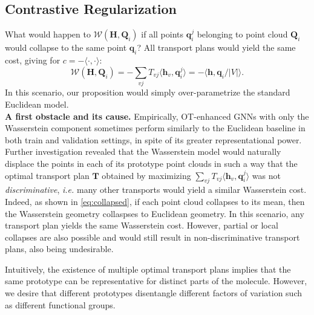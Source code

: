\documentclass[letterpaper]{article} \usepackage{aaai22}  \usepackage{times}  \usepackage{helvet}  \usepackage{courier}  \usepackage[hyphens]{url}  \usepackage{graphicx} \urlstyle{rm} \def\UrlFont{\rm}  \usepackage{natbib}  \usepackage{caption} \DeclareCaptionStyle{ruled}{labelfont=normalfont,labelsep=colon,strut=off} \frenchspacing  \setlength{\pdfpagewidth}{8.5in}  \setlength{\pdfpageheight}{11in}  \usepackage{algorithm}
\newcommand{\h}{{\mathbf h}}
\newcommand{\T}{{\mathbf T}}
\newcommand{\Q}{{\mathbf Q}}
\newcommand{\q}{{\mathbf q}}
\newcommand{\Was}{{\mathcal W}}
\begin{document}
\subsection{Contrastive Regularization}\label{sec:reg}

What would happen to $\Was(\mathbf{H},\Q_i)$ if all points $\q_i^j$ belonging to point cloud $\Q_i$ would collapse to the same point $\q_i$? All transport plans would yield the same cost, giving for $c=-\langle\cdot,\cdot\rangle$:
\begin{equation}\label{eq:collapsed}
    \Was(\mathbf{H},\Q_i) = -\sum_{vj}T_{vj}\langle \h_v ,\q_i^j \rangle = -\langle\h,\q_i /|V| \rangle.
\end{equation}
In this scenario, our proposition would simply over-parametrize the standard Euclidean model.\\


\noindent\textbf{A first obstacle and its cause.} Empirically, OT-enhanced GNNs with only the Wasserstein component sometimes perform similarly to the Euclidean baseline in both train and validation settings, in spite of its greater representational power. Further investigation revealed that the Wasserstein model would naturally displace the points in each of its prototype point clouds in such a way that the optimal transport plan $\T$ obtained by maximizing $\sum_{vj}T_{vj}\langle \h_v ,\q_i^j \rangle$ was not \textit{discriminative}, \textit{i.e.} many other transports would yield a similar Wasserstein cost. Indeed, as shown in \cref{eq:collapsed}, if each point cloud collapses to its mean, then the Wasserstein geometry collaspses to Euclidean geometry. In this scenario, any transport plan yields the same Wasserstein cost. However, partial or local collapses are also possible and would still result in non-discriminative transport plans, also being undesirable.

Intuitively, the existence of multiple optimal transport plans implies that the same prototype can be representative for distinct parts of the molecule. However, we desire that different prototypes disentangle different factors of variation such as different functional groups.
\end{document}
